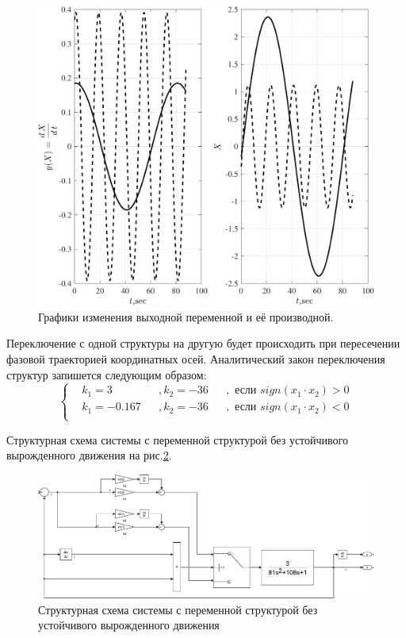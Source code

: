\begin{figure}[!h]\centering
\includegraphics[width=1.0\linewidth]{images/linear_2_por_sv_center}
\caption{ Графики изменения выходной переменной и её производной.}\label{fig:linear_2_por_sv_center}
\end{figure}

Переключение с одной структуры на другую будет происходить при пересечении фазовой траекторией координатных осей. Аналитический закон переключения структур запишется следующим образом:   
\begin{equation}
    \left\{
    \begin{aligned} \label{eq:usl_VSS_center}
       &k_1=3&&,k_2=-36&&,\text{ если }sign(x_1 \cdot x_2)>0\\
       &k_1=-0.167&&,k_2=-36&&,\text{ если }sign(x_1 \cdot x_2)<0\\
    \end{aligned}
    \right.
\end{equation}

Структурная схема системы с переменной структурой без устойчивого вырожденного движения на рис.\ref{fig:sim_VSS_no_steady_degenerate_motion}.
\begin{figure}[!h]\centering
\includegraphics[width=1.0\linewidth]{images/sim_VSS_no_steady_degenerate_motion}
\caption{Структурная схема системы с переменной структурой без устойчивого вырожденного движения}\label{fig:sim_VSS_no_steady_degenerate_motion}
\end{figure}

